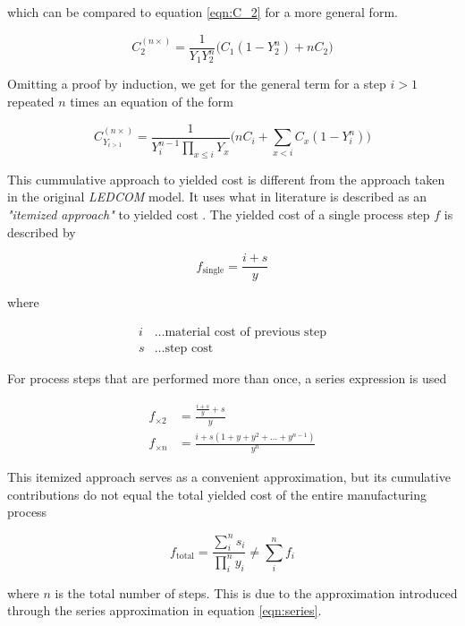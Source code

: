 \documentclass[10pt]{article}
\begin{document}
which can be compared to equation \ref{eqn:C_2} for a more general form.

\begin{equation}
    C_2^{(n \times)} = \frac{1}{Y_1 Y_2^n} \bigg( C_1 (1-Y_2^n)+nC_2\bigg)
\end{equation}

Omitting a proof by induction, we get for the general term for a step $i>1$ repeated $n$ times an equation of the form

\begin{equation}
\label{eqn:yielded_cost}
    C_{Y_{i>1}}^{(n \times)} = \frac{1}{Y_i^{n-1} \prod_{x \leq i} Y_x} \bigg( nC_i + \sum_{x < i} C_x (1-Y_i^n) \bigg)
\end{equation}

This cummulative approach to yielded cost is different from the approach taken in the original \textit{LEDCOM} model. It uses what in literature is described as an \textit{"itemized approach"} to yielded cost \cite{becker2001use}. The yielded cost of a single process step $f$ is described by

\begin{equation}
	f_\text{single} = \frac{i+s}{y}
\end{equation}

where

\begin{align*}
    i &\dots \text{material cost of previous step} \\
    s &\dots \text{step cost}
\end{align*}

For process steps that are performed more than once, a series expression is used

\begin{align}
\label{eqn:series}
    f_{\times 2} &=  \frac{\frac{i+s}{y}+s}{y} \\
    f_{\times n} &= \frac{i + s(1+y+y^2+ \dots + y^{n-1})}{y^n}
\end{align}

This itemized approach serves as a convenient approximation, but its cumulative contributions do not equal the total yielded cost of the entire manufacturing process

\begin{equation}
    f_\text{total} = \frac{\sum_i^n s_i}{\prod_i^ny_i} \neq \sum_i^n f_i
\end{equation}

where $n$ is the total number of steps. This is due to the approximation introduced through the series approximation in equation \ref{eqn:series}.
\end{document}
